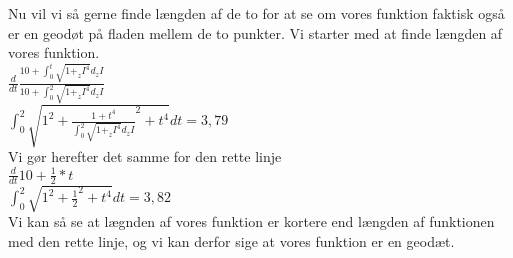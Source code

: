 Nu vil vi så gerne finde længden af de to for at se om vores funktion faktisk også er en geodøt på fladen mellem de to punkter. Vi starter med at finde længden af vores funktion. \\
$ \frac{d}{dt} \frac{10+\int_{0}^{t}\sqrt{1+_zI^4}d_zI}{10+\int_{0}^{2}\sqrt{1+_zI^4}d_zI}$ \\
$ \int_{0}^{2}\sqrt{1^2+ \frac{1+t^4}{\int_{0}^{2}\sqrt{1+_zI^4}d_zI}^2+t^4}dt=3,79  $\\
Vi gør herefter det samme for den rette linje \\
$ \frac{d}{dt}10+ \frac{1}{2}*t $\\
$\int_{0}^{2}\sqrt{1^2+\frac{1}{2}^2+t^4}dt=3,82 $\\
Vi kan så se at lægnden af vores funktion er kortere end længden af funktionen med den rette linje, og vi kan derfor sige at vores funktion er en geodæt.
